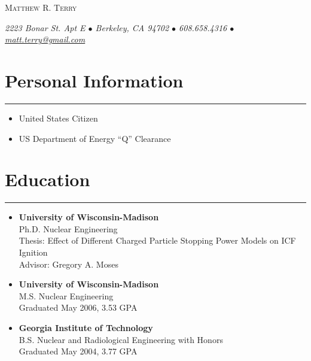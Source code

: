 \documentclass[letterpaper,11pt]{article}
\def\name{Matthew R. Terry}
\begin{document}
\begin{center}
	{\huge\scshape \name}

	\textit{%
		2223 Bonar St. Apt E $\bullet$
		Berkeley, CA 94702 $\bullet$
		608.658.4316 $\bullet$
		\href{mailto:matt.terry@gmail.com}{matt.terry@gmail.com}
	}
\end{center}


\section*{Personal Information}
\hrule
\vspace{0.05in}
\begin{itemize}
	\item United States Citizen
	\item US Department of Energy ``Q'' Clearance
\end{itemize}


\section*{Education}
\hrule
\vspace{0.05in}
\begin{itemize}
	\item 
		\textbf{University of Wisconsin-Madison} \\
		Ph.D. Nuclear Engineering \\
  		Thesis: Effect of Different Charged Particle Stopping Power Models on ICF Ignition \\
		Advisor: Gregory A. Moses
	\item 
		\textbf{University of Wisconsin-Madison} \\
		M.S. Nuclear Engineering \\
		Graduated May 2006, 3.53 GPA 
	\item 
		\textbf{Georgia Institute of Technology} \\
		B.S. Nuclear and Radiological Engineering with Honors \\
		Graduated May 2004, 3.77 GPA
\end{itemize}
\end{document}
